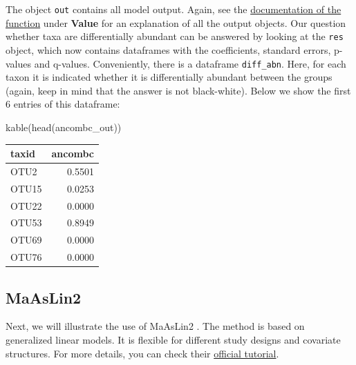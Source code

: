 \documentclass[
]{book}
\newenvironment{Shaded}{\begin{snugshade}}{\end{snugshade}}
\newcommand{\FunctionTok}[1]{\textcolor[rgb]{0.00,0.00,0.00}{#1}}
\newcommand{\NormalTok}[1]{#1}
\begin{document}
The object \texttt{out} contains all model output. Again, see the
\href{https://rdrr.io/github/FrederickHuangLin/ANCOMBC/man/ancombc.html}{documentation of the function}
under \textbf{Value} for an explanation of all the output objects. Our question
whether taxa are differentially abundant can be answered by looking at the
\texttt{res} object, which now contains dataframes with the coefficients,
standard errors, p-values and q-values. Conveniently, there is a dataframe
\texttt{diff\_abn}. Here, for each taxon it is indicated whether it is differentially
abundant between the groups (again, keep in mind that the answer is not
black-white). Below we show the first 6 entries of this dataframe:

\begin{Shaded}
\begin{Highlighting}[]
\FunctionTok{kable}\NormalTok{(}\FunctionTok{head}\NormalTok{(ancombc\_out))}
\end{Highlighting}
\end{Shaded}

\begin{tabular}{l|r}
\hline
taxid & ancombc\\
\hline
OTU2 & 0.5501\\
\hline
OTU15 & 0.0253\\
\hline
OTU22 & 0.0000\\
\hline
OTU53 & 0.8949\\
\hline
OTU69 & 0.0000\\
\hline
OTU76 & 0.0000\\
\hline
\end{tabular}

\hypertarget{maaslin2}{%
\subsection{MaAsLin2}\label{maaslin2}}

Next, we will illustrate the use of MaAsLin2 \citep{Mallick2020}. The method is based on
generalized linear models. It is flexible for different study designs
and covariate structures. For more details, you can check their \href{https://github.com/biobakery/biobakery/wiki/maaslin2}{official
tutorial}.
\end{document}

